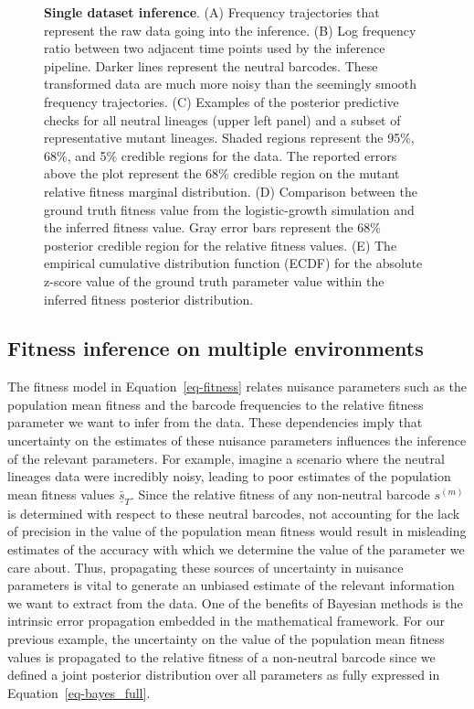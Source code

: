 \documentclass[
  letterpaper,
  DIV=11,
  numbers=noendperiod]{scrartcl}
\begin{document}
\begin{refsegment}
\begin{figure}
\caption{\label{fig-02}\textbf{Single dataset inference}. (A) Frequency
trajectories that represent the raw data going into the inference. (B)
Log frequency ratio between two adjacent time points used by the
inference pipeline. Darker lines represent the neutral barcodes. These
transformed data are much more noisy than the seemingly smooth frequency
trajectories. (C) Examples of the posterior predictive checks for all
neutral lineages (upper left panel) and a subset of representative
mutant lineages. Shaded regions represent the 95\%, 68\%, and 5\%
credible regions for the data. The reported errors above the plot
represent the 68\% credible region on the mutant relative fitness
marginal distribution. (D) Comparison between the ground truth fitness
value from the logistic-growth simulation and the inferred fitness
value. Gray error bars represent the 68\% posterior credible region for
the relative fitness values. (E) The empirical cumulative distribution
function (ECDF) for the absolute z-score value of the ground truth
parameter value within the inferred fitness posterior distribution.}

\end{figure}

\hypertarget{sec-multienv}{%
\subsection{Fitness inference on multiple
environments}\label{sec-multienv}}

The fitness model in Equation~\ref{eq-fitness} relates nuisance
parameters such as the population mean fitness and the barcode
frequencies to the relative fitness parameter we want to infer from the
data. These dependencies imply that uncertainty on the estimates of
these nuisance parameters influences the inference of the relevant
parameters. For example, imagine a scenario where the neutral lineages
data were incredibly noisy, leading to poor estimates of the population
mean fitness values \(\underline{\bar{s}}_T\). Since the relative
fitness of any non-neutral barcode \(s^{(m)}\) is determined with
respect to these neutral barcodes, not accounting for the lack of
precision in the value of the population mean fitness would result in
misleading estimates of the accuracy with which we determine the value
of the parameter we care about. Thus, propagating these sources of
uncertainty in nuisance parameters is vital to generate an unbiased
estimate of the relevant information we want to extract from the data.
One of the benefits of Bayesian methods is the intrinsic error
propagation embedded in the mathematical framework. For our previous
example, the uncertainty on the value of the population mean fitness
values is propagated to the relative fitness of a non-neutral barcode
since we defined a joint posterior distribution over all parameters as
fully expressed in Equation~\ref{eq-bayes_full}.


\end{refsegment}
\end{document}
